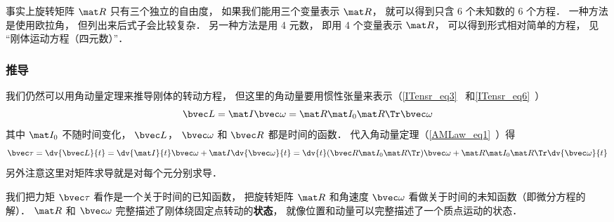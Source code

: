事实上旋转矩阵 $\mat R$ 只有三个独立的自由度， 如果我们能用三个变量表示 $\mat R$， 就可以得到只含 6 个未知数的 6 个方程． 一种方法是使用欧拉角， 但列出来后式子会比较复杂． 另一种方法是用 4 元数， 即用 4 个变量表示 $\mat R$， 可以得到形式相对简单的方程， 见 “刚体运动方程（四元数）”．


\subsubsection{推导}
我们仍然可以用角动量定理来推导刚体的转动方程， 但这里的角动量要用惯性张量来表示（\autoref{ITensr_eq3}~ 和\autoref{ITensr_eq6}~）
\begin{equation}
\bvec L = \mat I \bvec \omega = \mat R \mat I_0 \mat R\Tr \bvec \omega
\end{equation}
其中 $\mat I_0$ 不随时间变化， $\bvec L$， $\bvec \omega$ 和 $\bvec R$ 都是时间的函数． 代入角动量定理（\autoref{AMLaw_eq1}~）得
\begin{equation}\label{RBEqM_eq3}
\bvec \tau = \dv{\bvec L}{t} = \dv{\mat I}{t} \bvec\omega + \mat I \dv{\bvec\omega}{t}
= \dv{t} (\bvec R\mat I_0 \mat R\Tr) \bvec \omega + \mat R \mat I_0 \mat R\Tr \dv{\bvec \omega}{t}
\end{equation}
另外注意这里对矩阵求导就是对每个元分别求导．

我们把力矩 $\bvec \tau$ 看作是一个关于时间的已知函数， 把旋转矩阵 $\mat R$ 和角速度 $\bvec \omega$ 看做关于时间的未知函数（即微分方程的解）． $\mat R$ 和 $\bvec \omega$ 完整描述了刚体绕固定点转动的\textbf{状态}， 就像位置和动量可以完整描述了一个质点运动的状态．



